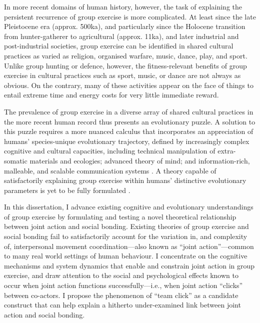 \begin{CJK}{UTF8}{gbsn}
In more recent domains of human history, however, the task of explaining the persistent recurrence of group exercise is more complicated.  At least since the late Pleistocene era (approx. 500ka), and particularly since the Holocene transition from hunter-gatherer to agricultural (approx. 11ka), and later industrial and post-industrial societies, group exercise can be identified in shared cultural practices as varied as religion, organised warfare, music, dance, play, and sport.  Unlike group hunting or defence, however, the fitness-relevant benefits of group exercise in cultural practices such as sport, music, or dance are not always as obvious.  On the contrary, many of these activities appear on the face of things to entail extreme time and energy costs for very little immediate reward.

The prevalence of group exercise in a diverse array of shared cultural practices in the more recent human record thus presents an evolutionary puzzle.  A solution to this puzzle requires a more nuanced calculus that incorporates an appreciation of humans' species-unique evolutionary trajectory, defined by increasingly complex cognitive and cultural capacities, including technical manipulation of extra-somatic materials and ecologies; advanced theory of mind; and information-rich, malleable, and scalable communication systems \citep{Roepstorff2010,Clark2015,Fuentes2016}.  A theory capable of satisfactorily explaining group exercise within humans' distinctive evolutionary parameters is yet to be fully formulated \citep{Cohen2017}.

In this dissertation, I advance existing cognitive and evolutionary understandings of group exercise by formulating and testing a novel theoretical relationship between joint action and social bonding.  Existing theories of group exercise and social bonding fail to satisfactorily account for the variation in, and complexity of, interpersonal movement coordination---also known as ``joint action''---common to many real world settings of human behaviour.  I concentrate on the cognitive mechanisms and system dynamics that enable and constrain joint action in group exercise, and draw attention to the social and psychological effects known to occur when joint action functions successfully---i.e., when joint action ``clicks'' between co-actors.  I propose the phenomenon of ``team click'' as a candidate construct that can help explain a hitherto under-examined link between joint action and social bonding.


\end{CJK}
